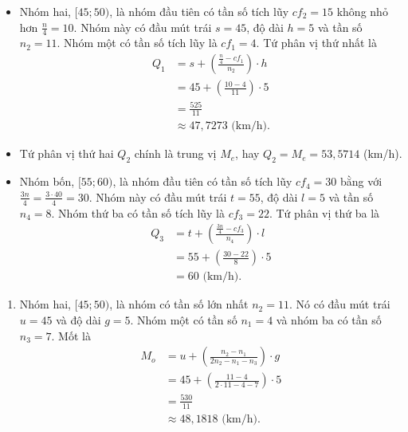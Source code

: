 \documentclass[
  letterpaper,
  DIV=11,
  numbers=noendperiod]{scrartcl}
\providecommand{\tightlist}{%
  \setlength{\itemsep}{0pt}\setlength{\parskip}{0pt}}\usepackage{longtable,booktabs,array}
\begin{document}
\begin{itemize}
\item
  Nhóm hai, \([45;50)\), là nhóm đầu tiên có tần số tích lũy \(cf_2=15\)
  không nhỏ hơn \(\frac{n}{4}=10\). Nhóm này có đầu mút trái \(s=45\),
  độ dài \(h=5\) và tần số \(n_2=11\). Nhóm một có tần số tích lũy là
  \(cf_1=4\). Tứ phân vị thứ nhất là \begin{align*}
        Q_1
            & = s + \left( \frac{\frac{n}{4}-cf_1}{n_2}\right)\cdot h \\
            & = 45 + \left(\frac{10-4}{11}\right)\cdot 5 \\
            & = \frac{525}{11} \\
            & \approx 47,7273 \text{ (km/h).}
    \end{align*}
\item
  Tứ phân vị thứ hai \(Q_2\) chính là trung vị \(M_e\), hay
  \(Q_2 = M_e = 53,5714\) (km/h).
\end{itemize}

\begin{itemize}
\tightlist
\item
  Nhóm bốn, \([55;60)\), là nhóm đầu tiên có tần số tích lũy \(cf_4=30\)
  bằng với \(\frac{3n}{4}=\frac{3\cdot 40}{4}=30\). Nhóm này có đầu mút
  trái \(t=55\), độ dài \(l=5\) và tần số \(n_4=8\). Nhóm thứ ba có tần
  số tích lũy là \(cf_3=22\). Tứ phân vị thứ ba là \begin{align*}
        Q_3
            & = t + \left(\frac{\frac{3n}{4}-cf_3}{n_4}\right)\cdot l \\
            & = 55 + \left(\frac{30-22}{8}\right)\cdot 5 \\
            & = 60 \text{ (km/h).}
    \end{align*}
\end{itemize}

\begin{enumerate}
\def\labelenumi{\alph{enumi}.}
\setcounter{enumi}{2}
\tightlist
\item
  Nhóm hai, \([45;50)\), là nhóm có tần số lớn nhất \(n_2=11\). Nó có
  đầu mút trái \(u=45\) và độ dài \(g=5\). Nhóm một có tần số \(n_1=4\)
  và nhóm ba có tần số \(n_3=7\). Mốt là \begin{align*}
       M_o
           & = u + \left(\frac{n_2-n_1}{2n_2-n_1-n_3}\right) \cdot g \\
           & = 45 + \left(\frac{11-4}{2\cdot 11-4-7}\right)\cdot 5 \\
           & = \frac{530}{11} \\
           & \approx 48,1818 \text{ (km/h)}.
   \end{align*}
\end{enumerate}
\end{document}
